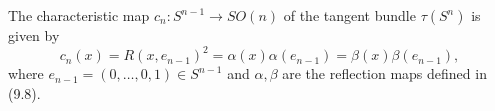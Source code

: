 The characteristic map $c_n: S^{n-1} \to SO(n)$ of the tangent bundle $\tau(S^n)$ is given by
$$c_n(x) = R(x, e_{n-1})^2 = \alpha(x)\alpha(e_{n-1}) = \beta(x)\beta(e_{n-1}),$$
where $e_{n-1} = (0, \ldots, 0, 1) \in S^{n-1}$ and $\alpha, \beta$ are the reflection maps defined in (9.8).
